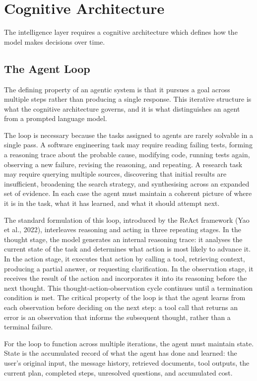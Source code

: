 \chapter{Cognitive Architecture}

The intelligence layer requires a cognitive architecture which defines how
the model makes decisions over time.

\section{The Agent Loop}

The defining property of an agentic system is that it pursues a goal across multiple
steps rather than producing a single response. This iterative structure is what the
cognitive architecture governs, and it is what distinguishes an agent from a prompted
language model.

The loop is necessary because the tasks assigned to agents are rarely solvable in a
single pass. A software engineering task may require reading failing tests, forming a
reasoning trace about the probable cause, modifying code, running tests again, observing
a new failure, revising the reasoning, and repeating. A research task may require
querying multiple sources, discovering that initial results are insufficient, broadening
the search strategy, and synthesising across an expanded set of evidence. In each case
the agent must maintain a coherent picture of where it is in the task, what it has
learned, and what it should attempt next.

The standard formulation of this loop, introduced by the ReAct framework (Yao et al.,
2022), interleaves reasoning and acting in three repeating stages. In the thought stage,
the model generates an internal reasoning trace: it analyses the current state of the
task and determines what action is most likely to advance it. In the action stage, it
executes that action by calling a tool, retrieving context, producing a partial answer,
or requesting clarification. In the observation stage, it receives the result of the
action and incorporates it into its reasoning before the next thought. This
thought-action-observation cycle continues until a termination condition is met. The
critical property of the loop is that the agent learns from each observation before
deciding on the next step: a tool call that returns an error is an observation that
informs the subsequent thought, rather than a terminal failure.

For the loop to function across multiple iterations, the agent must maintain state.
State is the accumulated record of what the agent has done and learned: the user's
original input, the message history, retrieved documents, tool outputs, the current
plan, completed steps, unresolved questions, and accumulated cost.


